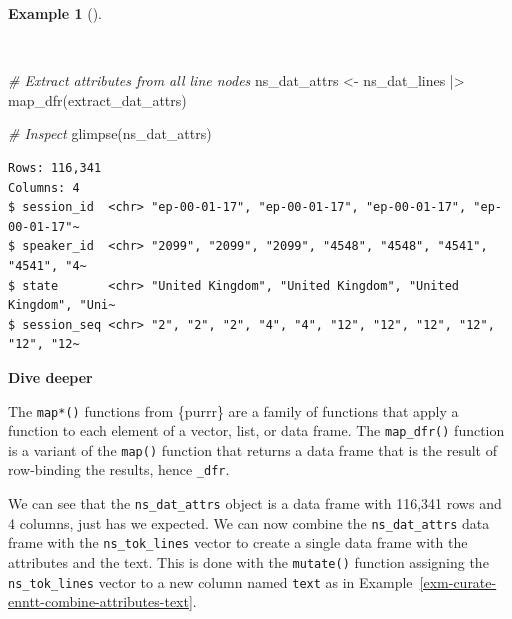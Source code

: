 \documentclass[
  letterpaper,
  krantz1]{latex/krantz-mod}
\newenvironment{Shaded}{\begin{snugshade}}{\end{snugshade}}
\newcommand{\CommentTok}[1]{\textcolor[rgb]{0.00,0.00,0.00}{\textit{#1}}}
\newcommand{\FunctionTok}[1]{\textcolor[rgb]{0.00,0.00,0.00}{#1}}
\newcommand{\NormalTok}[1]{\textcolor[rgb]{0.00,0.00,0.00}{#1}}
\newcommand{\OtherTok}[1]{\textcolor[rgb]{0.00,0.00,0.00}{#1}}
\newcommand{\SpecialCharTok}[1]{\textcolor[rgb]{0.00,0.00,0.00}{#1}}
\theoremstyle{definition}
\newtheorem{example}{Example}[chapter]
\theoremstyle{definition}
\theoremstyle{remark}
\begin{document}
\begin{example}[]\protect\hypertarget{exm-curate-enntt-extract-attributes-all}{}\label{exm-curate-enntt-extract-attributes-all}

~

\begin{Shaded}
\begin{Highlighting}[numbers=left,,]
\CommentTok{\# Extract attributes from all line nodes}
\NormalTok{ns\_dat\_attrs }\OtherTok{\textless{}{-}}
\NormalTok{  ns\_dat\_lines }\SpecialCharTok{|\textgreater{}}
  \FunctionTok{map\_dfr}\NormalTok{(extract\_dat\_attrs)}

\CommentTok{\# Inspect}
\FunctionTok{glimpse}\NormalTok{(ns\_dat\_attrs)}
\end{Highlighting}
\end{Shaded}

\begin{verbatim}
Rows: 116,341
Columns: 4
$ session_id  <chr> "ep-00-01-17", "ep-00-01-17", "ep-00-01-17", "ep-00-01-17"~
$ speaker_id  <chr> "2099", "2099", "2099", "4548", "4548", "4541", "4541", "4~
$ state       <chr> "United Kingdom", "United Kingdom", "United Kingdom", "Uni~
$ session_seq <chr> "2", "2", "2", "4", "4", "12", "12", "12", "12", "12", "12~
\end{verbatim}

\end{example}

\begin{tcolorbox}[enhanced jigsaw, leftrule=.75mm, colframe=quarto-callout-color-frame, left=2mm, colback=white, toprule=.15mm, breakable, arc=.35mm, opacityback=0, bottomrule=.15mm, rightrule=.15mm]

\textbf{ Dive deeper}

The \texttt{map*()} functions from \{purrr\} are a family of functions
that apply a function to each element of a vector, list, or data frame.
The \texttt{map\_dfr()} function is a variant of the \texttt{map()}
function that returns a data frame that is the result of row-binding the
results, hence \texttt{\_dfr}.

\end{tcolorbox}

We can see that the \texttt{ns\_dat\_attrs} object is a data frame with
116,341 rows and 4 columns, just has we expected. We can now combine the
\texttt{ns\_dat\_attrs} data frame with the \texttt{ns\_tok\_lines}
vector to create a single data frame with the attributes and the text.
This is done with the \texttt{mutate()} function assigning the
\texttt{ns\_tok\_lines} vector to a new column named \texttt{text} as in
Example~\ref{exm-curate-enntt-combine-attributes-text}.
\end{document}
